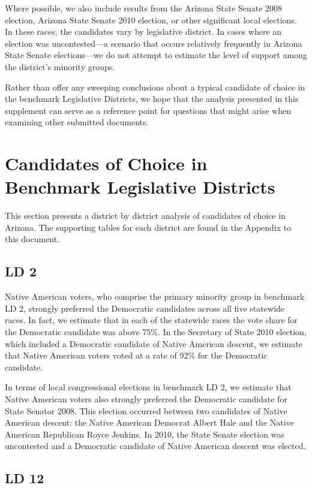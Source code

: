 \documentclass[12pt]{article}
\begin{document}
Where possible, we also include results from the Arizona State Senate 2008 election, Arizona State Senate 2010 election, or other significant local elections. In these races, the candidates vary by legislative district. In cases where an election was uncontested---a scenario that occurs relatively frequently in Arizona State Senate elections---we do not attempt to estimate the level of support among the district's minority groups.

Rather than offer any sweeping conclusions about a typical candidate of choice in the benchmark Legislative Districts, we hope that the analysis presented in this supplement can serve as a reference point for questions that might arise when examining other submitted documents. 

\section{Candidates of Choice in Benchmark Legislative Districts}

This section presents a district by district analysis of candidates of choice in Arizona. The supporting tables for each district are found in the Appendix to this document.

\subsection{LD 2}
Native American voters, who comprise the primary minority group in benchmark LD 2, strongly preferred the Democratic candidates across all five statewide races. In fact, we estimate that in each of the statewide races the vote share for the Democratic candidate was above 75\%. In the Secretary of State 2010 election, which included a Democratic candidate of Native American descent, we estimate that Native American voters voted at a rate of 92\% for the Democratic candidate. 

In terms of local congressional elections in benchmark LD 2, we estimate that Native American voters also strongly preferred the Democratic candidate for State Senator 2008. This election occurred between two candidates of Native American descent: the Native American Democrat Albert Hale and the Native American Republican Royce Jenkins. In 2010, the State Senate election was uncontested and a Democratic candidate of Native American descent was elected. 

\subsection{LD 12}
\end{document}
